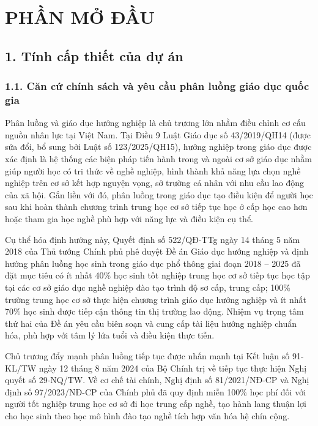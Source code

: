 \section*{PHẦN MỞ ĐẦU}

\subsection*{1. Tính cấp thiết của dự án}

\subsubsection*{1.1. Căn cứ chính sách và yêu cầu phân luồng giáo dục quốc gia}

Phân luồng và giáo dục hướng nghiệp là chủ trương lớn nhằm điều chỉnh cơ cấu nguồn nhân lực tại Việt Nam. Tại Điều 9 Luật Giáo dục số 43/2019/QH14 (được sửa đổi, bổ sung bởi Luật số 123/2025/QH15), hướng nghiệp trong giáo dục được xác định là hệ thống các biện pháp tiến hành trong và ngoài cơ sở giáo dục nhằm giúp người học có tri thức về nghề nghiệp, hình thành khả năng lựa chọn nghề nghiệp trên cơ sở kết hợp nguyện vọng, sở trường cá nhân với nhu cầu lao động của xã hội. Gắn liền với đó, phân luồng trong giáo dục tạo điều kiện để người học sau khi hoàn thành chương trình trung học cơ sở tiếp tục học ở cấp học cao hơn hoặc tham gia học nghề phù hợp với năng lực và điều kiện cụ thể.

Cụ thể hóa định hướng này, Quyết định số 522/QĐ-TTg ngày 14 tháng 5 năm 2018 của Thủ tướng Chính phủ phê duyệt Đề án Giáo dục hướng nghiệp và định hướng phân luồng học sinh trong giáo dục phổ thông giai đoạn 2018 -- 2025 đã đặt mục tiêu có ít nhất 40\% học sinh tốt nghiệp trung học cơ sở tiếp tục học tập tại các cơ sở giáo dục nghề nghiệp đào tạo trình độ sơ cấp, trung cấp; 100\% trường trung học cơ sở thực hiện chương trình giáo dục hướng nghiệp và ít nhất 70\% học sinh được tiếp cận thông tin thị trường lao động. Nhiệm vụ trọng tâm thứ hai của Đề án yêu cầu biên soạn và cung cấp tài liệu hướng nghiệp chuẩn hóa, phù hợp với tâm lý lứa tuổi và điều kiện thực tiễn.

Chủ trương đẩy mạnh phân luồng tiếp tục được nhấn mạnh tại Kết luận số 91-KL/TW ngày 12 tháng 8 năm 2024 của Bộ Chính trị về tiếp tục thực hiện Nghị quyết số 29-NQ/TW. Về cơ chế tài chính, Nghị định số 81/2021/NĐ-CP và Nghị định số 97/2023/NĐ-CP của Chính phủ đã quy định miễn 100\% học phí đối với người tốt nghiệp trung học cơ sở đi học trung cấp nghề, tạo hành lang thuận lợi cho học sinh theo học mô hình đào tạo nghề tích hợp văn hóa hệ chín cộng.

